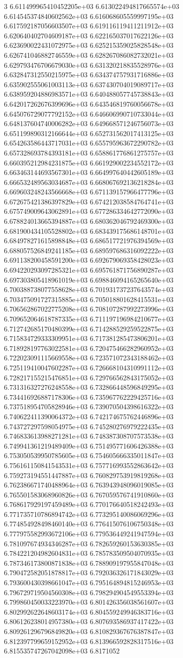 3	6.611499965410452205e+03	6.613022494817665574e+03	6.614545374840602562e+03	6.616068605559997195e+03	6.617592187056603507e+03	6.619116119411211912e+03	6.620640402704609187e+03	6.622165037017622126e+03	6.623690022431072975e+03	6.625215359025828548e+03	6.626741046882746559e+03	6.628267086082732021e+03	6.629793476706679030e+03	6.631320218835528976e+03	6.632847312550215975e+03	6.634374757931716886e+03	6.635902555061003113e+03	6.637430704019089717e+03	6.638959204886983571e+03	6.640488057745738843e+03	6.642017262676399696e+03	6.643546819760056678e+03	6.645076729077792152e+03	6.646606990710733044e+03	6.648137604740006282e+03	6.649668571246756073e+03	6.651199890312166644e+03	6.652731562017413125e+03	6.654263586443717031e+03	6.655795963672290782e+03	6.657328693784393181e+03	6.658861776861275757e+03	6.660395212984231875e+03	6.661929002234552172e+03	6.663463144693567301e+03	6.664997640442605189e+03	6.666532489563034687e+03	6.668067692136218284e+03	6.669603248243566668e+03	6.671139157966477796e+03	6.672675421386397829e+03	6.674212038584764741e+03	6.675749009643062891e+03	6.677286334642772090e+03	6.678824013665394887e+03	6.680362046792469300e+03	6.681900434105528802e+03	6.683439175686148701e+03	6.684978271615898848e+03	6.686517721976394569e+03	6.688057526849241185e+03	6.689597686316092222e+03	6.691138200458591200e+03	6.692679069358428023e+03	6.694220293097285321e+03	6.695761871756890287e+03	6.697303805418961019e+03	6.698846094165265640e+03	6.700388738077558628e+03	6.701931737237643574e+03	6.703475091727315885e+03	6.705018801628415531e+03	6.706562867022775208e+03	6.708107287992273996e+03	6.709652064618787335e+03	6.711197196984210677e+03	6.712742685170480399e+03	6.714288529259522875e+03	6.715834729333309951e+03	6.717381285473806201e+03	6.718928197763022581e+03	6.720475466282960952e+03	6.722023091115669558e+03	6.723571072343188462e+03	6.725119410047602287e+03	6.726668104310991112e+03	6.728217155215476851e+03	6.729766562843175052e+03	6.731316327276248558e+03	6.732866448596849295e+03	6.734416926887178306e+03	6.735967762229425716e+03	6.737518954705828946e+03	6.739070504398616322e+03	6.740622411390064372e+03	6.742174675762446896e+03	6.743727297598054975e+03	6.745280276979222435e+03	6.746833613988271281e+03	6.748387308707573538e+03	6.749941361219489409e+03	6.751495771606426388e+03	6.753050539950785605e+03	6.754605666335011847e+03	6.756161150841543531e+03	6.757716993552863642e+03	6.759273194551447887e+03	6.760829753919819268e+03	6.762386671740488964e+03	6.763943948096019085e+03	6.765501583068960826e+03	6.767059576741910860e+03	6.768617929197459489e+03	6.770176640518242493e+03	6.771735710786894742e+03	6.773295140086069296e+03	6.774854928498460140e+03	6.776415076106750348e+03	6.777975582993672106e+03	6.779536449241947594e+03	6.781097674934346287e+03	6.782659260153630385e+03	6.784221204982604831e+03	6.785783509504070935e+03	6.787346173800871838e+03	6.788909197955847048e+03	6.790472582051878817e+03	6.792036326171843029e+03	6.793600430398661047e+03	6.795164894815246953e+03	6.796729719504560308e+03	6.798294904549553394e+03	6.799860450033223970e+03	6.801426356038561607e+03	6.802992622648603174e+03	6.804559249946383716e+03	6.806126238014957380e+03	6.807693586937417422e+03	6.809261296796849820e+03	6.810829367676387847e+03	6.812397799659152952e+03	6.813966592828317516e+03	6.815535747267042098e+03	6.8171052